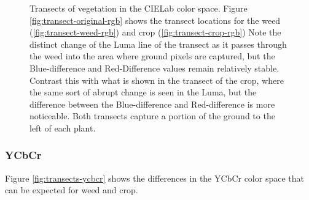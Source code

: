 \documentclass[letterpaper]{report}
\begin{document}
\begin{figure}[h]
	\centering
	\hfill
	\hfill
	\caption[CIELab Transects]{Transects of vegetation in the CIELab color space. Figure \ref{fig:transect-original-rgb} shows the transect locations for the weed (\ref{fig:transect-weed-rgb}) and crop (\ref{fig:transect-crop-rgb}) Note the distinct change of the Luma line of the transect as it passes through the weed into the area where ground pixels are captured, but the Blue-difference and Red-Difference values remain relatively stable. Contrast this with what is shown in the transect of the crop, where the same sort of abrupt change is seen in the Luma, but the difference between the Blue-difference and Red-difference is more noticeable. Both transects capture a portion of the ground to the left of each plant.}
	\label{fig:transects-cielab}
\end{figure}

\subsubsection{YCbCr}
Figure \ref{fig:transects-ycbcr} shows the differences in the YCbCr color space that can be expected for weed and crop.
\end{document}
